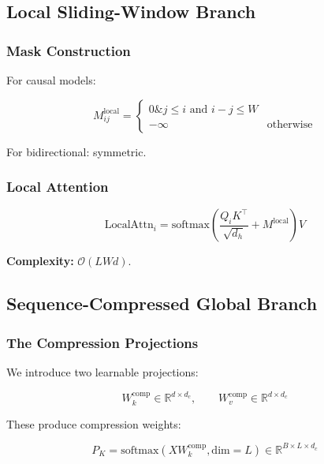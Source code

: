 \subsection{Local Sliding-Window Branch}

\subsubsection{Mask Construction}

For causal models:

\begin{equation}
M_{ij}^\text{local} = \begin{cases} 0 \& j \leq i \text{ and } i - j \leq W \\ -\infty & \text{otherwise} \end{cases}
\end{equation}

For bidirectional: symmetric.

\subsubsection{Local Attention}

\begin{equation}
\text{LocalAttn}_i = \text{softmax}\!\left(\frac{Q_i K^\top}{\sqrt{d_h}} + M^\text{local}\right) V
\end{equation}

\textbf{Complexity:} $\mathcal{O}(L W d)$.

\subsection{Sequence-Compressed Global Branch}

\subsubsection{The Compression Projections}

We introduce two learnable projections:

\begin{equation}
W_k^\text{comp} \in \mathbb{R}^{d \times d_c}, \qquad
W_v^\text{comp} \in \mathbb{R}^{d \times d_c}
\end{equation}

These produce compression weights:

\begin{equation}
P_K = \text{softmax}\!\left(X W_k^\text{comp}, \text{dim}=L\right) \in \mathbb{R}^{B \times L \times d_c}
\end{equation}


